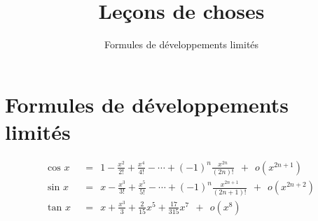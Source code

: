 







\title{{\bf Leçons de choses}}
\subtitle{Formules de développements limités}

\begin{frame}
  
  \debutmontitre

% 

\end{frame}

\setcounter{framenumber}{0}





\section{Formules de développements limités}



\begin{frame}
\bigskip\bigskip
{}
\begin{align*}
\text{cos } x &\ \ =\ \  1 - \frac{x^2}{2!}+\frac{x^4}{4!}- \cdots + (-1)^n \frac{x^{2n}}{(2n)!}\ \  + \ \ o(x^{2n+1}) \\[0.3cm]
\text{sin } x &\ \ =\ \  x - \frac{x^3}{3!}+\frac{x^5}{5!}- \cdots + (-1)^n \frac{x^{2n+1}}{(2n+1)!}\ \  + \ \ o(x^{2n+2})\\[0.3cm]
\text{tan } x &\ \ =\ \  x +  \frac{x^3}{3} + \frac{2}{15}x^5 + \frac{17}{315}x^7\ \  + \ \ o(x^{8})  \\[0.6cm]
\end{align*}

\end{frame}

